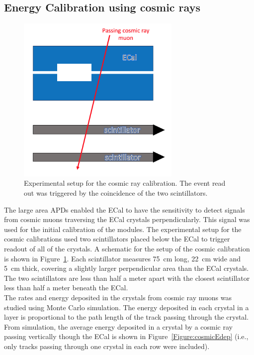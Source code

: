 \subsection{Energy Calibration using cosmic rays}
\begin{figure}[htb]
  \centering
      \includegraphics[width=0.7\textwidth]{pics/performance/cosmicschematic.png}
  \caption[Setup for ECal cosmic ray calibration]{Experimental setup for the cosmic ray calibration. The event read out was triggered by the coincidence of the two scintillators.}
  \label{Figure:cosmicScheme}
\end{figure}
The large area APDs enabled the ECal to have the sensitivity to detect signals from cosmic muons traversing the ECal crystals perpendicularly. This signal was used for the initial calibration of the modules. The experimental setup for the cosmic calibrations used two scintillators placed below the ECal to trigger readout of all of the crystals. A schematic for the setup of the cosmic calibration is shown in Figure~\ref{Figure:cosmicScheme}. Each scintillator measures 75~cm long, 22~cm wide and 5~cm thick, covering a slightly larger perpendicular area than the ECal crystals. The two scintillators are less than half a meter apart with the closest scintillator less than half a meter beneath the ECal. \\
\indent The rates and energy deposited in the crystals from cosmic ray muons was studied using Monte Carlo simulation. The energy deposited in each crystal in a layer is proportional to the path length of the track passing through the crystal. From simulation, the average energy deposited in a crystal by a cosmic ray passing vertically though the ECal is shown in Figure~\ref{Figure:cosmicEdep}  (i.e., only tracks passing through one crystal in each row were included).

